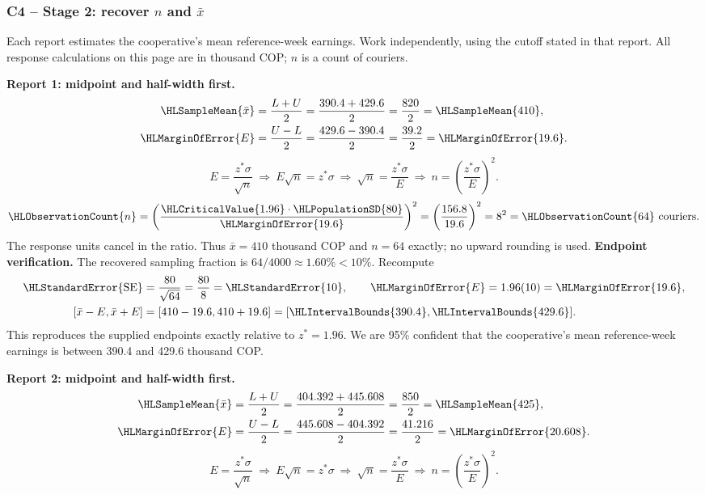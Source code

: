 \subsubsection*{C4 -- Stage 2: recover $n$ and $\bar x$}\label{sol:c4-1-b}
Each report estimates the cooperative's mean reference-week earnings. Work independently, using the cutoff stated in that report. All response calculations on this page are in thousand COP; $n$ is a count of couriers.
\par\noindent\textbf{Report 1: midpoint and half-width first.}
\[\begin{aligned}
\HLSampleMean{\bar x}&=\frac{L+U}{2}=\frac{390.4+429.6}{2}=\frac{820}{2}=\HLSampleMean{410},\\
\HLMarginOfError{E}&=\frac{U-L}{2}=\frac{429.6-390.4}{2}=\frac{39.2}{2}=\HLMarginOfError{19.6}.
\end{aligned}\]
\[E=\frac{z^*\sigma}{\sqrt n}\ \Longrightarrow\ E\sqrt n=z^*\sigma\ \Longrightarrow\ \sqrt n=\frac{z^*\sigma}{E}\ \Longrightarrow\ n=\left(\frac{z^*\sigma}{E}\right)^2.\]
\[\HLObservationCount{n}=\left(\frac{\HLCriticalValue{1.96}\cdot\HLPopulationSD{80}}{\HLMarginOfError{19.6}}\right)^2=\left(\frac{156.8}{19.6}\right)^2=8^2=\HLObservationCount{64}\text{ couriers}.\]
The response units cancel in the ratio. Thus $\bar x=410$ thousand COP and $n=64$ exactly; no upward rounding is used.
\textbf{Endpoint verification.} The recovered sampling fraction is $64/4000\approx 1.60\%<10\%$. Recompute
\[\begin{aligned}
\HLStandardError{\mathrm{SE}}&=\frac{80}{\sqrt{64}}=\frac{80}{8}=\HLStandardError{10},\qquad \HLMarginOfError{E}=1.96(10)=\HLMarginOfError{19.6},\\
[\bar x-E,\bar x+E]&=[410-19.6,410+19.6]=[\HLIntervalBounds{390.4},\HLIntervalBounds{429.6}].
\end{aligned}\]
This reproduces the supplied endpoints exactly relative to $z^*=1.96$. We are 95\% confident that the cooperative's mean reference-week earnings is between 390.4 and 429.6 thousand COP.
\par\noindent\textbf{Report 2: midpoint and half-width first.}
\[\begin{aligned}
\HLSampleMean{\bar x}&=\frac{L+U}{2}=\frac{404.392+445.608}{2}=\frac{850}{2}=\HLSampleMean{425},\\
\HLMarginOfError{E}&=\frac{U-L}{2}=\frac{445.608-404.392}{2}=\frac{41.216}{2}=\HLMarginOfError{20.608}.
\end{aligned}\]
\[E=\frac{z^*\sigma}{\sqrt n}\ \Longrightarrow\ E\sqrt n=z^*\sigma\ \Longrightarrow\ \sqrt n=\frac{z^*\sigma}{E}\ \Longrightarrow\ n=\left(\frac{z^*\sigma}{E}\right)^2.\]
